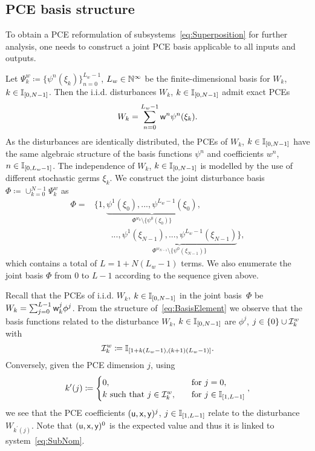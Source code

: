 \subsection{PCE basis structure} \label{sec:Structure}
To obtain a PCE reformulation of subsystems~\eqref{eq:Superposition} for further analysis, one needs to construct a joint PCE basis applicable to all inputs and outputs.

Let  $\Psi^{w}_k\coloneqq \{ \psi^n(\xi_k)\}_{n=0}^{L_w-1}$, $L_w\in\mathbb{N}^\infty$ be the finite-dimensional basis for $W_k$, $k\in\mathbb{I}_{[0,N-1]}$. Then the i.i.d. disturbances $W_{k}$, $k\in \mathbb{I}_{[0,N-1]}$ admit exact PCEs 
\begin{equation} \label{eq:WkPCE}
	W_k = \sum_{n=0}^{L_w-1} \mathsf{w}^n \psi^n(\xi_k).
\end{equation}
As the disturbances are identically distributed, the PCEs of $W_k$, $k\in\mathbb{I}_{[0,N-1]}$ have the same algebraic structure of the basis functions $\psi^n$ and coefficients $w^n$, $n\in\mathbb{I}_{[0,L_w-1]}$. The independence of $W_k$, $k\in\mathbb{I}_{[0,N-1]}$ is modelled by the use of different stochastic germs $\xi_k$.
We construct the joint disturbance basis $\Phi\coloneqq \cup_{k=0}^{N-1} \Psi^{w}_k$ as
\begin{equation}\label{eq:BasisElement}
	\begin{split} 
		\Phi = &\Big\{ 1, \underbrace{\psi^1(\xi_0),...,\psi^{L_w-1}(\xi_0)}_{\Phi^{w_0}\setminus \{\psi^0(\xi_0)\}},
		\\ &\qquad...,\underbrace{\psi^1(\xi_{N-1}),...,\psi^{L_w-1}(\xi_{N-1})}_{\Phi^{w_{N-1}}\setminus \{\psi^0(\xi_{N-1})\}}\Big\},
	\end{split}
\end{equation}
which contains a total of $L=1+N(L_w-1)$ terms. We also enumerate the joint basis $\Phi$ from 0 to $L-1$ according to the sequence given above.

Recall that the PCEs of i.i.d. $W_k$, $k\in\mathbb{I}_{[0,N-1]}$ in the joint basis~$\Phi$ be $W_k=\sum_{j=0}^{L-1}\mathsf{w}_k^j\phi^j$. From the structure of~\eqref{eq:BasisElement} we observe that the basis functions related to the disturbance $W_k$, $k\in\mathbb{I}_{[0,N-1]}$ are $\phi^j$, $j\in \{0\}\cup\mathcal{I}_{k}^w$ with
\[
	\mathcal{I}_{k}^w\coloneqq \mathbb{I}_{[1+k(L_w-1),(k+1)(L_w-1)]}.
\] 
Conversely, given the PCE dimension $j$, using
\begin{equation*} \label{eq:k}
	k^\prime(j) \coloneqq \begin{cases}
		0,~&\text{for } j=0,\\
		k \text{ such that } j\in\mathcal{I}_{k}^w, \quad &\text{for } j\in\mathbb{I}_{[1,L-1]}
	\end{cases},
\end{equation*}
we see that the PCE coefficients $(\mathsf{u},\mathsf{x},\mathsf{y})^j$, $j\in\mathbb{I}_{[1,L-1]}$  relate to the disturbance $W_{k^\prime(j)}$. Note that $(\mathsf{u},\mathsf{x},\mathsf{y})^0$ is the expected value and thus it is linked to system~\eqref{eq:SubNom}.

